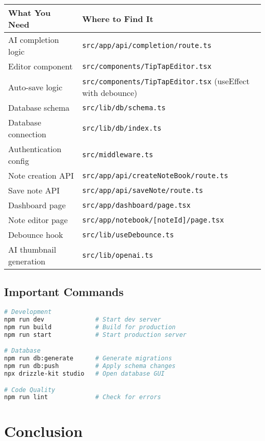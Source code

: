 \documentclass[11pt,a4paper]{article}
\begin{document}
\begin{table}[h]
\small
\begin{tabular}{|p{5cm}|p{8cm}|}
\hline
\textbf{What You Need} & \textbf{Where to Find It} \\
\hline
AI completion logic & \texttt{src/app/api/completion/route.ts} \\
\hline
Editor component & \texttt{src/components/TipTapEditor.tsx} \\
\hline
Auto-save logic & \texttt{src/components/TipTapEditor.tsx} (useEffect with debounce) \\
\hline
Database schema & \texttt{src/lib/db/schema.ts} \\
\hline
Database connection & \texttt{src/lib/db/index.ts} \\
\hline
Authentication config & \texttt{src/middleware.ts} \\
\hline
Note creation API & \texttt{src/app/api/createNoteBook/route.ts} \\
\hline
Save note API & \texttt{src/app/api/saveNote/route.ts} \\
\hline
Dashboard page & \texttt{src/app/dashboard/page.tsx} \\
\hline
Note editor page & \texttt{src/app/notebook/[noteId]/page.tsx} \\
\hline
Debounce hook & \texttt{src/lib/useDebounce.ts} \\
\hline
AI thumbnail generation & \texttt{src/lib/openai.ts} \\
\hline
\end{tabular}
\end{table}

\subsection{Important Commands}

\begin{lstlisting}[language=bash]
# Development
npm run dev              # Start dev server
npm run build            # Build for production
npm run start            # Start production server

# Database
npm run db:generate      # Generate migrations
npm run db:push          # Apply schema changes
npx drizzle-kit studio   # Open database GUI

# Code Quality
npm run lint             # Check for errors
\end{lstlisting}


\section{Conclusion}
\end{document}

